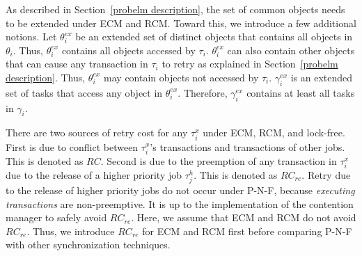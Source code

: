 As described in Section~\ref{probelm description}, the set of common objects needs to be extended under ECM and RCM. Toward this, we introduce a few additional notions. Let $\theta_i^{ex}$ be an extended set of distinct objects that contains all objects in $\theta_i$. Thus, $\theta_i^{ex}$ contains all objects  accessed by $\tau_i$. $\theta_i^{ex}$ can also contain other objects that can cause any transaction in $\tau_i$ to retry as explained in Section~\ref{probelm description}. Thus, $\theta_i^{ex}$ may contain objects not accessed by $\tau_i$. $\gamma_i^{ex}$ is an extended set of tasks that access any object in $\theta_i^{ex}$. Therefore, $\gamma_i^{ex}$ contains at least all tasks in $\gamma_i$.


There are two sources of retry cost for any $\tau_i^x$ under ECM, RCM, and lock-free. First is due to conflict between $\tau_i^x$'s transactions and transactions of other jobs. This is denoted as $RC$. Second is due to the preemption of any transaction in $\tau_i^x$ due to the release of a higher priority job $\tau_j^h$. This is denoted as $RC_{re}$. Retry due to the release of higher priority jobs do not occur under P-N-F,
because \emph{executing transactions} are non-preemptive. It is up to the implementation  of the contention manager to safely avoid $RC_{re}$. Here, we assume that ECM and RCM do not avoid $RC_{re}$. Thus, we introduce $RC_{re}$ for ECM and RCM first  before comparing P-N-F with other synchronization techniques.


